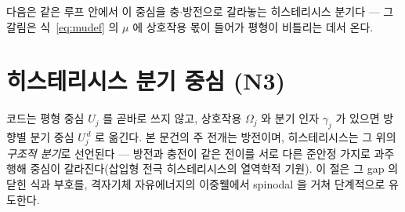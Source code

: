 \documentclass[11pt,a4paper]{article}
\begin{document}
다음은 같은 루프 안에서 이 중심을 충$\cdot$방전으로 갈라놓는 히스테리시스 분기다 — 그 갈림은 식~\eqref{eq:mudef} 의
$\mu$ 에 상호작용 몫이 들어가 평형이 비틀리는 데서 온다.

\section{히스테리시스 분기 중심 (N3)}\label{sec:hys}
코드는 평형 중심 $U_j$ 를 곧바로 쓰지 않고, 상호작용 $\Omega_j$ 와 분기 인자 $\gamma_j$ 가 있으면 방향별 분기 중심
$U_j^{\,d}$ 로 옮긴다. 본 문건의 주 전개는 방전이며, 히스테리시스는 그 위의 \emph{구조적 분기}로 선언된다 — 방전과 충전이
같은 전이를 서로 다른 준안정 가지로 과주행해 중심이 갈라진다(삽입형 전극 히스테리시스의 열역학적 기원\cite{dreyer2010}).
이 절은 그 gap 의 닫힌 식과 부호를, 격자기체 자유에너지의
이중웰에서 spinodal 을 거쳐 단계적으로 유도한다.
\end{document}
